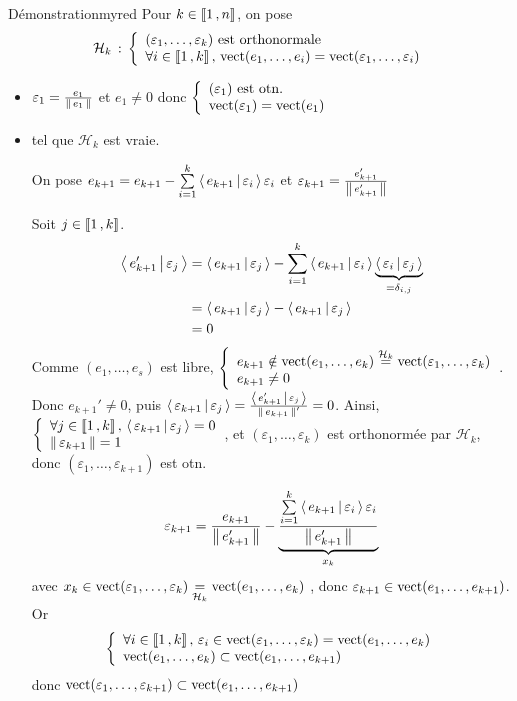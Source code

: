        \begin{demo}{Démonstration}{myred}
            Pour $k \in \left\llbracket 1 \, , n \right\rrbracket$, on pose 
            \[ \mathcal{H}_k \,: \, \et{(\varepsilon_1,\ldots,\varepsilon_k) \text{ est orthonormale}}{\forall i \in \intervalleEntier{1}{k}, \, \vect(e_1,\ldots,e_i) = \vect(\varepsilon_1,\ldots,\varepsilon_i)} \]
            \begin{itemize}
                \item {} \quad  $\varepsilon_1 = \frac{e_1}{\left\lVert \,e_1 \, \right\rVert}$ et $e_1 \neq 0$ donc $\et{(\varepsilon_1) \text{ est otn.}}{\vect(\varepsilon_1) = \vect(e_1)}$
                \item {} tel que $\mathcal{H}_k$ est vraie. 
                
                On pose $e_{k+1} = e_{k+1} - \sum\limits_{i=1}^{k} \left<\,e_{k+1}\,\middle|\,\varepsilon_i\,\right>\varepsilon_i$ et $\varepsilon_{k+1} = \frac{e_{k+1}'}{\left\lVert \,e_{k+1}' \, \right\rVert}$
                
                Soit $j \in \left\llbracket 1 \, , k \right\rrbracket$.
                \begin{align*}
                    \left<\,e_{k+1}'\,\middle|\,\varepsilon_j\,\right> &= \left<\,e_{k+1}\,\middle|\,\varepsilon_j\,\right> - \sum\limits_{i=1}^{k} \left<\,e_{k+1}\,\middle|\,\varepsilon_i\,\right>\underbrace{\left<\,\varepsilon_i\,\middle|\,\varepsilon_j\,\right>}_{= \delta_{i,j}} \\
                    &= \left<\,e_{k+1}\,\middle|\,\varepsilon_j\,\right> - \left<\,e_{k+1}\,\middle|\,\varepsilon_j\,\right> \\
                    &= 0
                \end{align*} 
                Comme $(e_1,\ldots,e_s)$ est libre, $\et{e_{k+1} \notin \vect(e_1,\ldots,e_k) \overset{\mathcal{H}_k}{=} \vect(\varepsilon_1, \ldots, \varepsilon_k)}{e_{k+1} \neq 0} $. Donc $e_{k+1}' \neq 0$, puis $\left<\,\varepsilon_{k+1}\,\middle|\,\varepsilon_j\,\right> = \frac{\left<\,e_{k+1}'\,\middle|\,\varepsilon_j\,\right>}{\left\lVert \,e_{k+1} \, \right\rVert'} = 0$. Ainsi, $\et{\forall j \in \intervalleEntier{1}{k}, \, \spr{\varepsilon_{k+1}}{\varepsilon_j} = 0}{\norm{\varepsilon_{k+1}} = 1}$, et $(\varepsilon_1, \ldots, \varepsilon_k)$ est orthonormée par $\mathcal{H}_k$, donc $(\varepsilon_1, \ldots, \varepsilon_{k+1})$ est otn.
                
                \[ \varepsilon_{k+1} = \frac{e_{k+1}}{\left\lVert \,e_{k+1}' \, \right\rVert} - \underbrace{\frac{\sum\limits_{i=1}^k \left<\,e_{k+1}\,\middle|\,\varepsilon_i\,\right>\varepsilon_i}{\left\lVert \,e_{k+1}' \, \right\rVert}}_{x_k} \]
                avec $x_k \in \operatorname{vect}(\varepsilon_1,\ldots,\varepsilon_k) \underset{\mathcal{H}_k}{=} \operatorname{vect}(e_1,\ldots,e_k)$ , donc $\varepsilon_{k+1} \in \operatorname{vect}(e_1,\ldots,e_{k+1})$. Or 
                \[ \et{\forall i \in \intervalleEntier{1}{k}, \, \varepsilon_i \in \vect(\varepsilon_1, \ldots, \varepsilon_k) = \vect(e_1,\ldots,e_k)}{\vect(e_1,\ldots,e_k) \subset \vect(e_1, \ldots, e_{k+1})} \] 
                donc $\operatorname{vect}(\varepsilon_1,\ldots,\varepsilon_{k+1}) \subset \operatorname{vect}(e_1,\ldots,e_{k+1})$
                

\end{itemize}
\end{demo}
